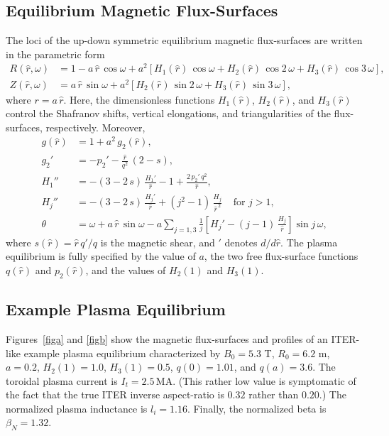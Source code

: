 \documentclass[12pt,prb,aps]{revtex4-1}
\begin{document}
\subsection{Equilibrium Magnetic Flux-Surfaces}
The loci of the up-down symmetric equilibrium magnetic flux-surfaces are written in the parametric form\,\cite{tear5}
\begin{align}
R(\hat{r},\omega) &= 1 -a\,\hat{r}\,\cos\omega + a^{2}\left[H_1(\hat{r})\,\cos \omega + H_2(\hat{r})\,\cos 2\,\omega+H_3(\hat{r})\,\cos 3\,\omega\right], \label{e19x}\\[0.5ex]
Z(\hat{r},\omega)&= a\,\hat{r}\,\sin\omega +a^{2}\left[H_2(\hat{r})\,\sin 2\,\omega+H_3(\hat{r})\,\sin 3\,\omega\right], \label{e20x}
\end{align}
where  $r=a\,\hat{r}$. 
Here, the dimensionless functions $H_1(\hat{r})$, $H_2(\hat{r})$, and $H_3(\hat{r})$ control the Shafranov shifts, vertical elongations, and  triangularities of
the flux-surfaces, respectively. 
Moreover,\cite{exp}
\begin{align}
g(\hat{r}) &= 1+ a^2\,g_2(\hat{r}),\\[0.5ex]
g_2'&= -p_2' - \frac{\hat{r}}{q^2}\,(2-s),\\[0.5ex]
H_1''&= -(3-2\,s)\,\frac{H_1' }{\hat{r}}-1+\frac{2\,p_2'\,q^2}{\hat{r}},\label{e27}\\[0.5ex]
H_j''&= -(3-2\,s)\,\frac{H_j'}{\hat{r}}+(j^2-1)\,\frac{H_j}{\hat{r}^{\,2}}~~~~~\mbox{for $j>1$},\label{e33x}\\[0.5ex]
\theta &= \omega+a\,\hat{r}\,\sin\omega - a\sum_{j=1,3}\frac{1}{j}\left[H_j'-(j-1)\,\frac{H_j}{\hat{r}}\right]\sin j\,\omega,
\end{align}
where $s(\hat{r}) = \hat{r}\,q'/q$ is the magnetic shear, and $'$ denotes $d/d\hat{r}$. The plasma equilibrium is fully specified by the value of $a$, the two free
flux-surface functions $q(\hat{r})$ and $p_2(\hat{r})$, and the values of $H_2(1)$ and $H_3(1)$. 

\subsection{Example Plasma Equilibrium}
Figures~\ref{figa} and \ref{figb} show the magnetic flux-surfaces and profiles of an ITER-like  example plasma equilibrium characterized by 
$B_0=5.3$ T, $R_0=6.2$ m, $a=0.2$, $H_2(1)=1.0$,  $H_3(1)= 0.5$, $q(0)=1.01$, and  $q(a)=3.6$.  The toroidal plasma current is $I_t=2.5$\,MA. (This rather low value
is symptomatic of the fact that the true ITER inverse aspect-ratio is  $0.32$ rather than $0.20$.) The normalized plasma inductance is
$l_i=1.16$. Finally, the normalized beta is $\beta_N= 1.32$. 
\end{document}
